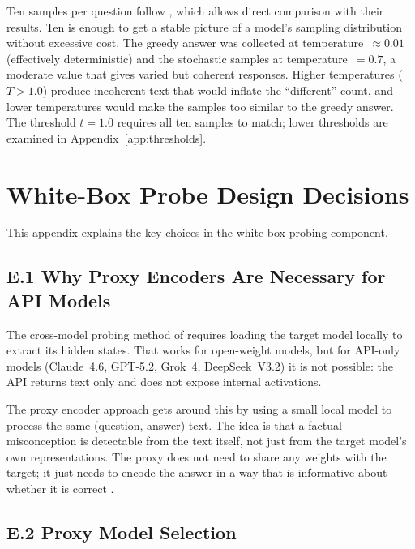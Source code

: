 \documentclass[12pt,twocolumn]{article}
\begin{document}
Ten samples per question follow \citet{tan2025consistent}, which
allows direct comparison with their results. Ten is enough to get
a stable picture of a model's sampling distribution without
excessive cost. The greedy answer was collected at
temperature~$\approx 0.01$ (effectively deterministic) and the
stochastic samples at temperature~$= 0.7$, a moderate value that
gives varied but coherent responses. Higher temperatures
($T > 1.0$) produce incoherent text that would inflate the
``different'' count, and lower temperatures would make the samples
too similar to the greedy answer. The threshold $t{=}1.0$ requires
all ten samples to match; lower thresholds are examined in
Appendix~\ref{app:thresholds}.

\section{White-Box Probe Design Decisions}
\label{app:wb-design}

This appendix explains the key choices in the white-box probing
component.

\subsection*{E.1 Why Proxy Encoders Are Necessary for API Models}

The cross-model probing method of \citet{tan2025consistent} requires
loading the target model locally to extract its hidden states. That
works for open-weight models, but for API-only models (Claude~4.6,
GPT-5.2, Grok~4, DeepSeek~V3.2) it is not possible: the API returns
text only and does not expose internal activations.

The proxy encoder approach gets around this by using a small local
model to process the same (question, answer) text. The idea is that
a factual misconception is detectable from the text itself, not just
from the target model's own representations. The proxy does not need
to share any weights with the target; it just needs to encode the
answer in a way that is informative about whether it is correct
\citep{tan2025consistent, han2025factuality, kossen2024semantic}.

\subsection*{E.2 Proxy Model Selection}
\end{document}
